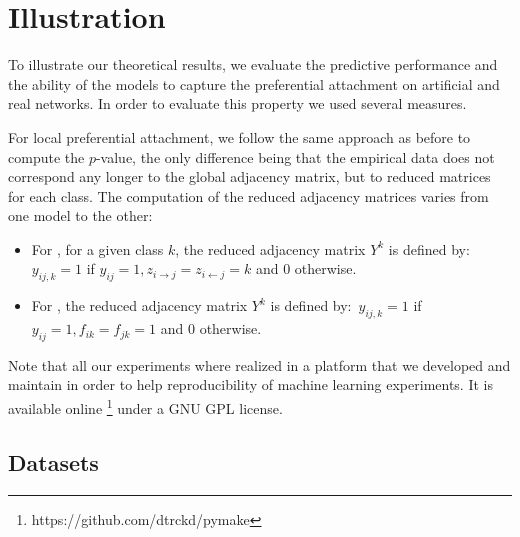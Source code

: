 \section{Illustration}
\label{sec:exps}

To illustrate our theoretical results, we evaluate the predictive performance and the ability of the models to capture the preferential attachment on artificial and real networks. In order to evaluate this property we used several measures.




For local preferential attachment, we follow the same approach as before to compute the $p$-value, the only difference being that the empirical data does not correspond any longer to the global adjacency matrix, but to reduced matrices for each class. The computation of the reduced adjacency matrices varies from one model to the other:

\begin{itemize}
    \item For \imb, for a given class $k$, the reduced adjacency matrix $Y^k$ is defined by:~$y_{ij,k}=1$ if $y_{ij}=1, z_{i\rightarrow j}=z_{i\leftarrow j}=k$ and $0$ otherwise.
    \item For \ifm, the reduced adjacency matrix $Y^k$ is defined by:~$ y_{ij,k}=1$ if $y_{ij}=1 , f_{ik}=f_{jk}=1$ and $0$ otherwise.
\end{itemize}


Note that all our experiments where realized in a platform that we developed and maintain in order to help reproducibility of machine learning experiments. It is available online \footnote{https://github.com/dtrckd/pymake} under a GNU GPL license.

\subsection{Datasets}

